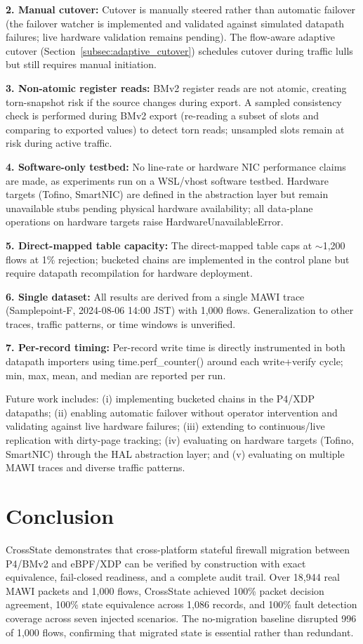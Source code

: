 \documentclass[10pt, conference]{IEEEtran}
\begin{document}
\textbf{2. Manual cutover:} Cutover is manually steered rather than automatic failover (the failover watcher is implemented and validated against simulated datapath failures; live hardware validation remains pending). The flow-aware adaptive cutover (Section~\ref{subsec:adaptive_cutover}) schedules cutover during traffic lulls but still requires manual initiation.

\textbf{3. Non-atomic register reads:} BMv2 register reads are not atomic, creating torn-snapshot risk if the source changes during export. A sampled consistency check is performed during BMv2 export (re-reading a subset of slots and comparing to exported values) to detect torn reads; unsampled slots remain at risk during active traffic.

\textbf{4. Software-only testbed:} No line-rate or hardware NIC performance claims are made, as experiments run on a WSL/vhost software testbed. Hardware targets (Tofino, SmartNIC) are defined in the abstraction layer but remain unavailable stubs pending physical hardware availability; all data-plane operations on hardware targets raise HardwareUnavailableError.

\textbf{5. Direct-mapped table capacity:} The direct-mapped table caps at $\sim$1{,}200 flows at 1\% rejection; bucketed chains are implemented in the control plane but require datapath recompilation for hardware deployment.

\textbf{6. Single dataset:} All results are derived from a single MAWI trace (Samplepoint-F, 2024-08-06 14:00 JST) with 1,000 flows. Generalization to other traces, traffic patterns, or time windows is unverified.

\textbf{7. Per-record timing:} Per-record write time is directly instrumented in both datapath importers using time.perf\_counter() around each write+verify cycle; min, max, mean, and median are reported per run.

Future work includes: (i) implementing bucketed chains in the P4/XDP datapaths; (ii) enabling automatic failover without operator intervention and validating against live hardware failures; (iii) extending to continuous/live replication with dirty-page tracking; (iv) evaluating on hardware targets (Tofino, SmartNIC) through the HAL abstraction layer; and (v) evaluating on multiple MAWI traces and diverse traffic patterns.

\section{Conclusion}
\label{sec:conclusion}
CrossState demonstrates that cross-platform stateful firewall migration between P4/BMv2 and eBPF/XDP can be verified by construction with exact equivalence, fail-closed readiness, and a complete audit trail. Over 18{,}944 real MAWI packets and 1{,}000 flows, CrossState achieved 100\% packet decision agreement, 100\% state equivalence across 1{,}086 records, and 100\% fault detection coverage across seven injected scenarios. The no-migration baseline disrupted 996 of 1{,}000 flows, confirming that migrated state is essential rather than redundant.
\end{document}
